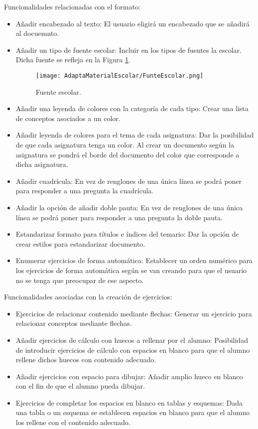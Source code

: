 Funcionalidades relacionadas con el formato:
\begin{itemize}
  \item Añadir encabezado al texto: El usuario eligirá un encabezado que se añadirá al docuemnto.
  \item Añadir un tipo de fuente escolar: Incluir en los tipos de fuentes la escolar. Dicha fuente se refleja en la Figura \ref{escolar}.
        \begin{figure}[ht!]
          \centering
          \texttt{[image: AdaptaMaterialEscolar/FunteEscolar.png]}
          \caption{Fuente escolar.}
          \label{escolar}
        \end{figure}
  \item Añadir una leyenda de colores con la categoría de cada tipo: Crear una lista de conceptos asociados a un color.
  \item Añadir leyenda de colores para el tema de cada asignatura: Dar la posibilidad de que cada asignatura tenga un color. Al crear un documento según la asignatura se pondrá el borde del documento del color que corresponde a dicha asignatura.
  \item Añadir cuadrícula: En vez de renglones de una única línea se podrá poner para responder a una pregunta la cuadrícula.
  \item Añadir la opción de añadir doble pauta: En vez de renglones de una única línea se podrá poner para responder a una pregunta la doble pauta.
  \item Estandarizar formato para títulos e índices del temario: Dar la opción de crear estilos para estandarizar documento.
  \item Enumerar ejercicios de forma automática: Establecer un orden numérico para los ejercicios de forma automática según se van creando para que el usuario no se tenga que preocupar de ese aspecto.
\end{itemize}
Funcionalidades asociadas con la creación de ejercicios:
\begin{itemize}
  \item Ejercicios de relacionar contenido mediante flechas: Generar un ejercicio para relacionar conceptos mediante flechas.
  \item Añadir ejercicios de cálculo con huecos a rellenar por el alumno: Posibilidad de introducir ejercicios de cálculo con espacios en blanco para que el alumno rellene dichos huecos con contenido adecuado.
  \item Añadir ejercicios con espacio para dibujar: Añadir amplio hueco en blanco con el fin de que el alumno pueda dibujar.
  \item Ejercicios de completar los espacios en blanco en tablas y esquemas: Dada una tabla o un esquema se establecen espacios en blanco para que el alumno los rellene con el contenido adecuado.
\end{itemize}
